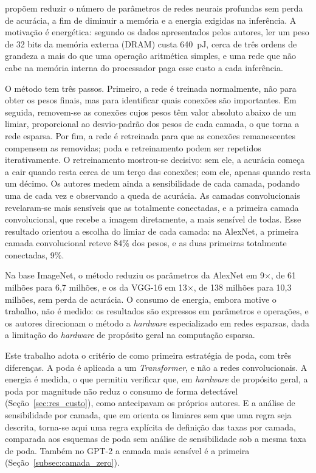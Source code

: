  propõem reduzir o número de parâmetros de redes neurais profundas sem
perda de acurácia, a fim de diminuir a memória e a energia exigidas na inferência. A
motivação é energética: segundo os dados apresentados pelos autores, ler um peso de 32 bits
da memória externa (DRAM) custa 640~pJ, cerca de três ordens de grandeza a mais do que uma
operação aritmética simples, e uma rede que não cabe na memória interna do processador paga
esse custo a cada inferência.

O método tem três passos. Primeiro, a rede é treinada normalmente, não para obter os pesos
finais, mas para identificar quais conexões são importantes. Em seguida, removem-se as
conexões cujos pesos têm valor absoluto abaixo de um limiar, proporcional ao desvio-padrão
dos pesos de cada camada, o que torna a rede esparsa. Por fim, a rede é retreinada para que
as conexões remanescentes compensem as removidas; poda e retreinamento podem ser repetidos
iterativamente. O retreinamento mostrou-se decisivo: sem ele, a acurácia começa a cair
quando resta cerca de um terço das conexões; com ele, apenas quando resta um décimo. Os
autores medem ainda a sensibilidade de cada camada, podando uma de cada vez e observando a
queda de acurácia. As camadas convolucionais revelaram-se mais sensíveis que as totalmente
conectadas, e a primeira camada convolucional, que recebe a imagem diretamente, a mais
sensível de todas. Esse resultado orientou a escolha do limiar de cada camada: na AlexNet,
a primeira camada convolucional reteve 84\% dos pesos, e as duas primeiras totalmente
conectadas, 9\%.

Na base ImageNet, o método reduziu os parâmetros da AlexNet em 9$\times$, de 61 milhões para
6,7 milhões, e os da VGG-16 em 13$\times$, de 138 milhões para 10,3 milhões, sem perda de
acurácia. O consumo de energia, embora motive o trabalho, não é medido: os resultados são
expressos em parâmetros e operações, e os autores direcionam o método a \textit{hardware}
especializado em redes esparsas, dada a limitação do \textit{hardware} de propósito geral
na computação esparsa.

Este trabalho adota o critério de  como primeira estratégia de poda,
com três diferenças. A poda é aplicada a um
\textit{Transformer}, e não a redes convolucionais. A energia é medida, o que permitiu
verificar que, em \textit{hardware} de propósito geral, a poda por magnitude não reduz o
consumo de forma detectável (Seção~\ref{sec:res_custo}), como antecipavam os próprios
autores. E a análise de sensibilidade por camada, que em  orienta os
limiares sem que uma regra seja descrita, torna-se aqui uma regra explícita de definição
das taxas por camada, comparada aos esquemas de poda sem análise de sensibilidade sob a mesma taxa
de poda. Também no GPT-2 a camada mais sensível é a
primeira (Seção~\ref{subsec:camada_zero}).

